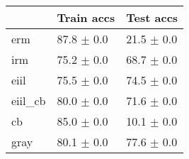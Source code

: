 \begin{tabular}{lll}
\toprule
{} &      Train accs &       Test accs \\
\midrule
erm     &  87.8 $\pm$ 0.0 &  21.5 $\pm$ 0.0 \\
irm     &  75.2 $\pm$ 0.0 &  68.7 $\pm$ 0.0 \\
eiil    &  75.5 $\pm$ 0.0 &  74.5 $\pm$ 0.0 \\
eiil_cb &  80.0 $\pm$ 0.0 &  71.6 $\pm$ 0.0 \\
cb      &  85.0 $\pm$ 0.0 &  10.1 $\pm$ 0.0 \\
gray    &  80.1 $\pm$ 0.0 &  77.6 $\pm$ 0.0 \\
\bottomrule
\end{tabular}

